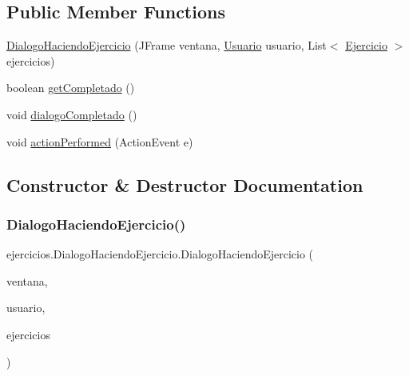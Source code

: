 \subsection*{Public Member Functions}
\begin{DoxyCompactItemize}
\item 
\mbox{\hyperlink{classejercicios_1_1_dialogo_haciendo_ejercicio_ae87994df5b05d1b795ab929cc0045434}{Dialogo\+Haciendo\+Ejercicio}} (J\+Frame ventana, \mbox{\hyperlink{classclases_1_1_usuario}{Usuario}} usuario, List$<$ \mbox{\hyperlink{classclases_1_1_ejercicio}{Ejercicio}} $>$ ejercicios)
\item 
boolean \mbox{\hyperlink{classejercicios_1_1_dialogo_haciendo_ejercicio_a97a3810d8067e62084728c06011d89d7}{get\+Completado}} ()
\item 
void \mbox{\hyperlink{classejercicios_1_1_dialogo_haciendo_ejercicio_a3178de5a2ceb6cc8c392312799ced5c7}{dialogo\+Completado}} ()
\item 
void \mbox{\hyperlink{classejercicios_1_1_dialogo_haciendo_ejercicio_acbb0e882f350a175b5bde43d5de6baa2}{action\+Performed}} (Action\+Event e)
\end{DoxyCompactItemize}


\subsection{Constructor \& Destructor Documentation}
\mbox{\label{classejercicios_1_1_dialogo_haciendo_ejercicio_ae87994df5b05d1b795ab929cc0045434}} 
\subsubsection{\texorpdfstring{Dialogo\+Haciendo\+Ejercicio()}{DialogoHaciendoEjercicio()}}
{\footnotesize\ttfamily ejercicios.\+Dialogo\+Haciendo\+Ejercicio.\+Dialogo\+Haciendo\+Ejercicio (\begin{DoxyParamCaption}\item[{J\+Frame}]{ventana,  }\item[{\mbox{\hyperlink{classclases_1_1_usuario}{Usuario}}}]{usuario,  }\item[{List$<$ \mbox{\hyperlink{classclases_1_1_ejercicio}{Ejercicio}} $>$}]{ejercicios }\end{DoxyParamCaption})}



